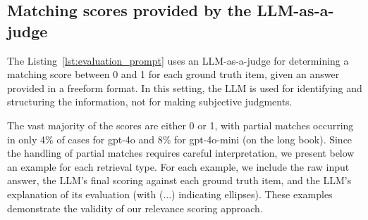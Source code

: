 \documentclass{article}
\begin{document}
\subsection{Matching scores provided by the LLM-as-a-judge}\label{sec:llm_judge_evaluation_insights}

The Listing~\ref{lst:evaluation_prompt} uses an LLM-as-a-judge for determining a matching score between 0 and 1 for each ground truth item, given an answer provided in a freeform format.
In this setting, the LLM is used for identifying and structuring the information, not for making subjective judgments.

The vast majority of the scores are either 0 or 1, with partial matches occurring in only 4\% of cases for gpt-4o and 8\% for gpt-4o-mini (on the long book). Since the handling of partial matches requires careful interpretation, we present below an example for each retrieval type. For each example, we include the raw input answer, the LLM's final scoring against each ground truth item, and the LLM's explanation of its evaluation (with (...) indicating ellipses). These examples demonstrate the validity of our relevance scoring approach.

\end{document}
